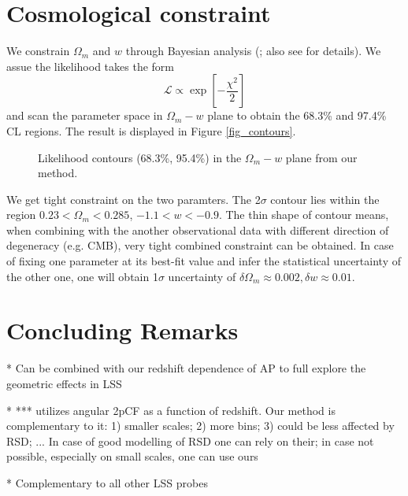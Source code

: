 \documentclass[iop]{emulateapj}
\begin{document}
\section{Cosmological constraint}



We constrain $\Omega_m$ and $w$ through Bayesian analysis (\citep{Bayesian}; also see \citep{LB2002,Li2016} for details).
We assue the likelihood takes the form
\begin{equation}
 \mathcal{L} \propto \exp\left[-\frac{\chi^2}{2}\right]
\end{equation}
and scan the parameter space in $\Omega_m-w$ plane to obtain the 68.3\% and 97.4\% CL regions.
The result is displayed in Figure \ref{fig_contours}.


\begin{figure}
   \centering{
   }
   \caption{\label{fig9.eps}
   Likelihood contours (68.3\%, 95.4\%) in the $\Omega_m-w$ plane from our method.
   }
\end{figure}

We get tight constraint on the two paramters.
The 2$\sigma$ contour lies within the region $0.23<\Omega_m<0.285$, $-1.1<w<-0.9$.
The thin shape of contour means, when combining with the another observational data with different direction of degeneracy (e.g. CMB),
very tight combined constraint can be obtained.
In case of fixing one parameter at its best-fit value and infer the statistical uncertainty of the other one,
one will obtain 1$\sigma$ uncertainty of $\delta\Omega_m\approx0.002,\delta w\approx0.01$. 


\section{Concluding Remarks}



 * Can be combined with our redshift dependence of AP to full explore the geometric effects in LSS

 * *** utilizes angular 2pCF as a function of redshift. Our method is complementary to it: 1) smaller scales; 2) more bins; 3) could be less affected by RSD; ... In case of good modelling of RSD one can rely on their; in case not possible, especially on small scales, one can use ours

 * Complementary to all other LSS probes
\end{document}
